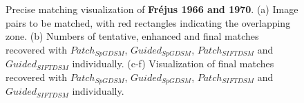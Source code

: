 \begin{figure}[htbp]
\begin{center}
{		}
		\caption{Precise matching visualization of \textbf{Fr{\'e}jus 1966 and 1970}. (a) Image pairs to be matched, with red rectangles indicating the overlapping zone. (b) Numbers of tentative, enhanced and final matches recovered with $Patch_{SpGDSM}$, $Guided_{SpGDSM}$, $Patch_{SIFTDSM}$ and $Guided_{SIFTDSM}$ individually. (c-f) Visualization of final matches recovered with $Patch_{SpGDSM}$, $Guided_{SpGDSM}$, $Patch_{SIFTDSM}$ and $Guided_{SIFTDSM}$ individually.}
		\label{MatchVizFrejus1966-1970}
	\end{center}
\end{figure} 


